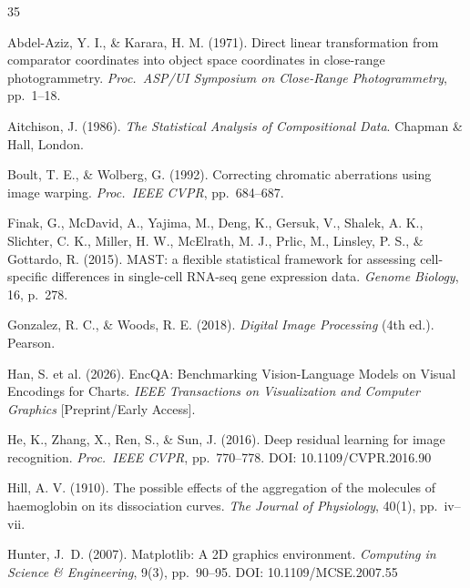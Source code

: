 \documentclass[11pt,twocolumn]{article}
\begin{document}
\begin{thebibliography}{35}

Abdel-Aziz, Y. I., \& Karara, H. M. (1971).
\newblock Direct linear transformation from comparator coordinates into object space coordinates in close-range photogrammetry.
\newblock \emph{Proc.\ ASP/UI Symposium on Close-Range Photogrammetry}, pp.\ 1--18.

Aitchison, J. (1986).
\newblock \emph{The Statistical Analysis of Compositional Data}.
\newblock Chapman \& Hall, London.

Boult, T. E., \& Wolberg, G. (1992).
\newblock Correcting chromatic aberrations using image warping.
\newblock \emph{Proc.\ IEEE CVPR}, pp.\ 684--687.

Finak, G., McDavid, A., Yajima, M., Deng, K., Gersuk, V., Shalek, A. K., Slichter, C. K., Miller, H. W., McElrath, M. J., Prlic, M., Linsley, P. S., \& Gottardo, R. (2015).
\newblock MAST: a flexible statistical framework for assessing cell-specific differences in single-cell RNA-seq gene expression data.
\newblock \emph{Genome Biology}, 16, p.\ 278.

Gonzalez, R. C., \& Woods, R. E. (2018).
\newblock \emph{Digital Image Processing} (4th ed.).
\newblock Pearson.

Han, S. et al. (2026).
\newblock EncQA: Benchmarking Vision-Language Models on Visual Encodings for Charts.
\newblock \emph{IEEE Transactions on Visualization and Computer Graphics} [Preprint/Early Access].

He, K., Zhang, X., Ren, S., \& Sun, J. (2016).
\newblock Deep residual learning for image recognition.
\newblock \emph{Proc.\ IEEE CVPR}, pp.\ 770--778.
\newblock DOI: 10.1109/CVPR.2016.90

Hill, A. V. (1910).
\newblock The possible effects of the aggregation of the molecules of haemoglobin on its dissociation curves.
\newblock \emph{The Journal of Physiology}, 40(1), pp.\ iv--vii.

Hunter, J.~D. (2007).
\newblock Matplotlib: A 2D graphics environment.
\newblock \emph{Computing in Science \& Engineering}, 9(3), pp.\ 90--95.
\newblock DOI: 10.1109/MCSE.2007.55


\end{thebibliography}
\end{document}
